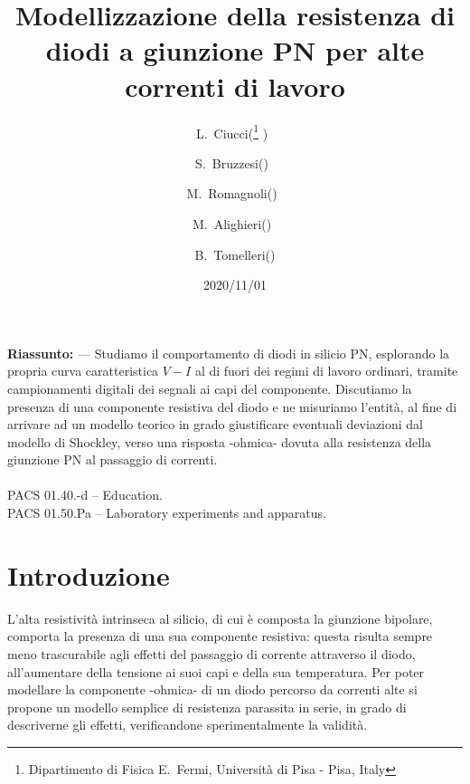 \documentclass{article}[a4paper, oneside, 11pt]
\title{Modellizzazione della resistenza di diodi a giunzione PN per alte 
correnti di lavoro}
\author{L.~Ciucci(\thanks{Dipartimento di Fisica E.~Fermi, Universit\`a di Pisa 
- Pisa, Italy} )~\and S.~Bruzzesi(\protect\footnotemark[1] )~\and 
M.~Romagnoli(\protect\footnotemark[1] )~\and 
M.~Alighieri(\protect\footnotemark[1] )~\and 
B.~Tomelleri(\protect\footnotemark[1] )}
\date{2020/11/01}
\begin{document}
\maketitle

\begin{mdframed}
\textbf{Riassunto:} --- Studiamo il comportamento di diodi in silicio PN,
esplorando la propria curva caratteristica $V - I$ al di fuori dei regimi di
lavoro ordinari, tramite campionamenti digitali dei segnali ai capi del
componente. Discutiamo la presenza di una componente resistiva del diodo e ne
misuriamo l'entità, al fine di arrivare ad un modello teorico in grado
giustificare eventuali deviazioni dal modello di Shockley, verso una risposta
-ohmica- dovuta alla resistenza della giunzione PN al passaggio di correnti.\\\\
PACS 01.40.-d – Education.\\
PACS 01.50.Pa – Laboratory experiments and apparatus.
\end{mdframed}


\section{Introduzione}
L'alta resistività intrinseca al silicio, di cui è composta la giunzione
bipolare, comporta la presenza di una sua componente resistiva: questa 
risulta sempre meno trascurabile agli effetti del passaggio di corrente
attraverso il diodo, all'aumentare della tensione ai suoi capi e della sua 
temperatura. Per poter modellare la componente -ohmica- di un diodo
percorso da correnti alte si propone un modello semplice di resistenza
parassita in serie, in grado di descriverne gli effetti, verificandone 
sperimentalmente la validità.


\end{document}
